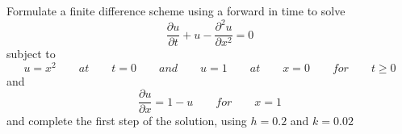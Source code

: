 Formulate a finite difference scheme using a forward in time to solve  
\[
\frac{\partial u}{\partial t } + u - \frac{\partial^2 u}{\partial x^2 } = 0
\] 
subject to  
\[
u=x^2 \qquad at \qquad t=0 \qquad and \qquad u=1 \qquad at \qquad x=0 \qquad for \qquad t\geq 0
\] 
and
\[ 
\frac{\partial u} {\partial x}=  1-u \qquad for \qquad x=1 
\]
and complete the first step of the solution, using $h=0.2$ and $k=0.02$

